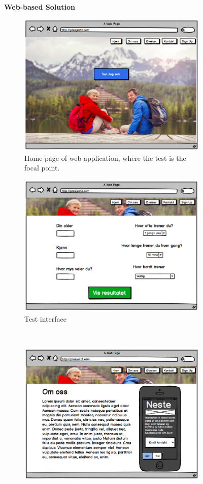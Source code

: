 \begin{figure}[H]
\centering
 \textbf{Web-based Solution}\par\medskip
\begin{subfigure}{.5\textwidth}
  \centering
  \includegraphics[width=.8\linewidth]{wireframes/web/Home}
  \caption{Home page of web application, where the test is the focal point.}
  \label{fig:videoHome}
\end{subfigure}%
\begin{subfigure}{.5\textwidth}
  \centering
  \includegraphics[width=.8\linewidth]{wireframes/web/TestDetails}
  \caption{Test interface}
  \label{fig:videoTest}
\end{subfigure}\\
\break
\begin{subfigure}{.5\textwidth}
  \centering
  \includegraphics[width=.8\linewidth]{wireframes/web/About}

\end{subfigure}
\end{figure}
